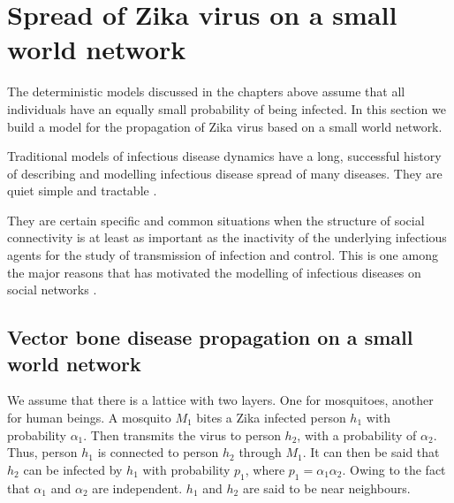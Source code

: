 \chapter{ Spread of Zika virus on a small world network }
The deterministic models discussed in the chapters above assume that all individuals have an equally small probability of being infected. In this section we build a model for the propagation of Zika virus based on a small world network.

Traditional models of infectious disease dynamics have a long, successful history of describing and modelling infectious disease spread of many diseases. They are quiet simple and tractable \citep{fu2013propagation}.

They are certain specific and common situations when the structure of social connectivity is at least as important as the inactivity of the underlying infectious agents for the study of transmission of infection and control. This is one among the major reasons that has motivated the modelling of infectious diseases on social networks \cite{fu2013propagation}.



\section{ Vector bone disease propagation on a small world network}
We assume that there is a lattice with two layers. One for mosquitoes, another for human beings. A mosquito $M_1$ bites a Zika infected person $h_1$ with probability $\alpha_1$. Then transmits the virus to person $h_2$, with a probability of $\alpha_2$. Thus, person $h_1$ is connected to  person $h_2$ through $M_1$. It can then be said that $h_2$ can be infected by $h_1$ with probability $p_1$, where $p_1 =  \alpha_1 \alpha_2$. Owing to the fact that $\alpha_1$ and $\alpha_2$ are  independent. $h_1$ and $h_2$ are said to be near neighbours. 

